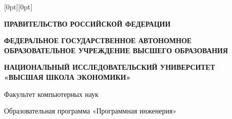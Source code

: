 \thispagestyle{approval}
\enlargethispage{3cm}

\noindent
\raisebox{-25cm}[0pt][0pt]{%
%
}%

\begin{center}
\textbf{ПРАВИТЕЛЬСТВО РОССИЙСКОЙ ФЕДЕРАЦИИ}

\textbf{ФЕДЕРАЛЬНОЕ ГОСУДАРСТВЕННОЕ АВТОНОМНОЕ\\
ОБРАЗОВАТЕЛЬНОЕ УЧРЕЖДЕНИЕ ВЫСШЕГО ОБРАЗОВАНИЯ}

\textbf{НАЦИОНАЛЬНЫЙ ИССЛЕДОВАТЕЛЬСКИЙ УНИВЕРСИТЕТ\\
«ВЫСШАЯ ШКОЛА ЭКОНОМИКИ»}

\vspace{0.2cm}

\small
Факультет компьютерных наук

Образовательная программа «Программная инженерия»
\end{center}

\vspace{0.3cm}

